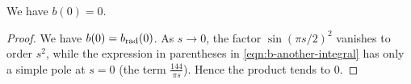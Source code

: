 \begin{proposition}\label{prop:b0}\leanok
We have $b(0) = 0$.
\end{proposition}
\begin{proof}
We have $b(0) = b_{\mathrm{rad}}(0)$. As $s \to 0$, the factor $\sin(\pi s/2)^2$ vanishes to order $s^2$, while the expression in parentheses in \eqref{eqn:b-another-integral} has only a simple pole at $s = 0$ (the term $\frac{144}{\pi s}$). Hence the product tends to $0$.
\end{proof}

